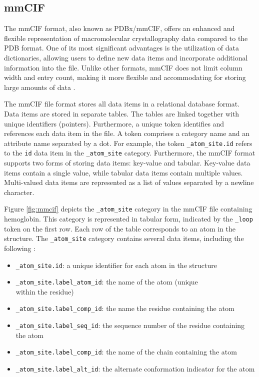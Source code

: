 \documentclass[
  digital,     %
  oneside,     %
  nosansbold,  %
  nocolorbold, %
  lof,         %
  lot,         %
]{fithesis4}
\begin{document}
\subsection{mmCIF}
\label{subsection:mmcif}

The mmCIF format, also known as PDBx/mmCIF, offers an enhanced and flexible representation of macromolecular crystallography data compared to the PDB format. One of its most significant advantages is the utilization of data dictionaries, allowing users to define new data items and incorporate additional information into the file. Unlike other formats, mmCIF does not limit column width and entry count, making it more flexible and accommodating for storing large amounts of data \cite{qtpie}.

The mmCIF file format stores all data items in a relational database format. Data items are stored in separate tables. The tables are linked together with unique identifiers (pointers). Furthermore, a unique token identifies and references each data item in the file. A token comprises a category name and an attribute name separated by a dot. For example, the token \texttt{\_atom\_site.id} refers to the \texttt{id} data item in the \texttt{\_atom\_site} category. Furthermore, the mmCIF format supports two forms of storing data items: key-value and tabular. Key-value data items contain a single value, while tabular data items contain multiple values. Multi-valued data items are represented as a list of values separated by a newline character. \cite{pdb101}

Figure \ref{fig:mmcif} depicts the \texttt{\_atom\_site} category in the mmCIF file containing hemoglobin. This category is represented in tabular form, indicated by the \texttt{\_loop} token on the first row. Each row of the table corresponds to an atom in the structure. The \texttt{\_atom\_site} category contains several data items, including the following \cite{mmcif_dictionary}:

\begin{itemize}
  \item \texttt{\_atom\_site.id}: a unique identifier for each atom in the structure
  \item \texttt{\_atom\_site.label\_atom\_id}: the name of the atom (unique \\
  within the residue)
  \item \texttt{\_atom\_site.label\_comp\_id}: the name the residue containing the atom
  \item \texttt{\_atom\_site.label\_seq\_id}: the sequence number of the residue containing the atom
  \item \texttt{\_atom\_site.label\_comp\_id}: the name of the chain containing the atom
  \item \texttt{\_atom\_site.label\_alt\_id}: the alternate conformation indicator for the atom
\end{itemize}
\end{document}
